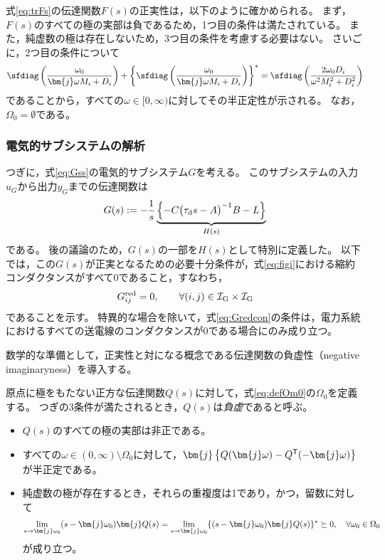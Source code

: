 \documentclass[tombow,dvipdfmx]{corona-a5}
\begin{document}
式\ref{eq:trFs}の伝達関数$F(s)$の正実性は，以下のように確かめられる。
まず，$F(s)$のすべての極の実部は負であるため，1つ目の条件は満たされている。
また，純虚数の極は存在しないため，3つ目の条件を考慮する必要はない。
さいごに，2つ目の条件について
\begin{align*}
\sfdiag \left( 
\frac{\omega_0}{ \bm{j} \omega M_i + D_i}
\right)
+
\left\{
\sfdiag \left( 
\frac{\omega_0}{\bm{j} \omega M_i + D_i}
\right)
\right\}^*
=
\sfdiag \left( 
\frac{2 \omega_0 D_i}{\omega^2 M_i^2 + D_i^2}
\right)
\end{align*}
であることから，すべての$\omega\in [0,\infty)$に対してその半正定性が示される。
なお，$\Omega_0=\emptyset$である。




\subsubsection{電気的サブシステムの解析}


つぎに，式\ref{eq:Gss}の電気的サブシステム$G$を考える。
このサブシステムの入力$u_G$から出力$y_G$までの伝達関数は
\begin{align}\label{eq:trGs}
G(s) :=  - \frac{1}{s} 
\underbrace{
\left\{ -C \bigl( \tau_{\rm d} s -A \bigr)^{-1} B - L \right\}
}_{H(s)}
\end{align}
である。
後の議論のため，$G(s)$の一部を$H(s)$として特別に定義した。
以下では，この$G(s)$が正実となるための必要十分条件が，式\ref{eq:figi}における縮約コンダクタンスがすべて0であること，すなわち，
\begin{align}\label{eq:Gredcon}
G^{\rm red}_{ij}=0,\qquad 
\forall (i, j) \in \mathcal{I}_{\rm G} \times \mathcal{I}_{\rm G}
\end{align}
であることを示す。
特異的な場合を除いて，式\ref{eq:Gredcon}の条件は，電力系統におけるすべての送電線のコンダクタンスが0である場合にのみ成り立つ。

数学的な準備として，正実性と対になる概念である伝達関数の負虚性（negative imaginaryness）を導入する\cite{petersen2010feedback,xiong2010negative}。

\begin{定義}[伝達関数の負虚性]
\label{def:trni}
原点に極をもたない正方な伝達関数$Q(s)$に対して，式\ref{eq:defOm0}の$\Omega_0$を定義する。
つぎの3条件が満たされるとき，$Q(s)$は\emph{負虚}であると呼ぶ。
\begin{itemize}
\item $Q(s)$のすべての極の実部は非正である。
\item すべての$\omega \in (0,\infty)\setminus \Omega_0$に対して，$\bm{j}\left\{Q(\bm{j} \omega) - Q^{\sf T}(-\bm{j} \omega) \right\}$が半正定である。
\item 純虚数の極が存在するとき，それらの重複度は1であり，かつ，留数に対して
\begin{align*}
\lim_{s \rightarrow \bm{j} \omega_0} (s-\bm{j} \omega_0) \bm{j} Q(s) = 
\lim_{s\rightarrow \bm{j} \omega_0} \{ (s-\bm{j} \omega_0) \bm{j} Q(s)\}^{\sf *}\succeq 0
,\quad
\forall \omega_0 \in \Omega_0
\end{align*}
が成り立つ。
\end{itemize}
\end{定義}
\end{document}
